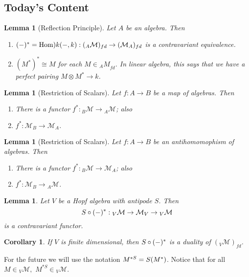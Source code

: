 \documentclass[12pt]{article}
\theoremstyle{break}
\theoremstyle{nonumberbreak}
\theoremstyle{changebreak}
\newtheorem{lem}[thm]{Lemma}
\newtheorem{cor}[thm]{Corollary}
\theoremstyle{break}
\theoremstyle{nonumberbreak}
\theoremstyle{nonumberplain}
\theoremstyle{change}
\newcommand*{\Hom}{\ensuremath\text{Hom}}
\newcommand*{\calM}{\mathcal{M}}
\let\tilde\relax
\newcommand*{\tilde}[1]{\widetilde{#1}}
\begin{document}
\subsection{Today's Content}
\begin{lem}[Reflection Principle]\label{lem-ref]}
	Let $A$ be an algebra. Then
	\begin{enumerate}
		\item $(-)^*=\Hom)k(-,k):({_A\calM})_{fd}\to(\calM_A)_{fd}$ is a contravariant equivalence.
		\item $(M^*)^*\cong M$ for each $M\in{_AM}_{fd}$. In linear algebra, this says that we have a perfect pairing $M\otimes M^*\to k$.
	\end{enumerate}
\end{lem}
\begin{lem}[Restriction of Scalars]\label{lem-res1]}
	Let $f:A\to B$ be a map of algebras. Then
	\begin{enumerate}
		\item There is a functor $f^*:{_B\calM}\to{_A\calM}$; also 
		\item $f^*:\calM_B\to\calM_A$.
	\end{enumerate}
\end{lem}
\begin{lem}[Restriction of Scalars]\label{lem-res2}
	Let $f:A\to B$ be an antihomomophism of algebras. Then
	\begin{enumerate}
		\item There is a functor $f^*:{_B\calM}\to{\calM_A}$; also 
		\item $f^*:\calM_B\to{_A\calM}$.
	\end{enumerate}
\end{lem}
\begin{lem}
	Let $V$ be a Hopf algebra with antipode $S$. Then 
	\[\tilde S\circ (-)^*:{_V\calM}\to \calM_V\to {_V\calM}\]
	is a contravariant functor.
\end{lem}
\begin{cor}
	If $V$ is finite dimensional, then $\tilde S\circ(-)^*$ is a duality of $(_V\calM)_{fd}$.
\end{cor}
For the future we will use the notation $M^{*S}=\tilde S(M^*)$. Notice that for all $M\in{_V\calM},$ $M^{*S}\in{_V\calM}$.
\end{document}
